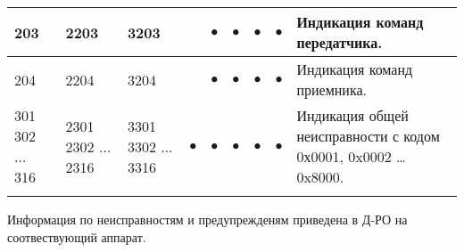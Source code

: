 \begin{tabularx}{\linewidth}{| *{3}{M{1cm} |} *{5}{M{0.3cm} |} X|}
	203			& %
	2203		& %
	3203		& %
			 	& %
	$\bullet$ 	& %
	$\bullet$ 	& %
	$\bullet$ 	& %
	$\bullet$ 	& %
	Индикация команд передатчика.	 
	\tabularnewline \hline
	
	204			& %
	2204		& %
	3204		& %
			 	& %
	$\bullet$ 	& %
	$\bullet$ 	& %
	$\bullet$ 	& %
	$\bullet$ 	& %
	Индикация команд приемника.	
	\tabularnewline \hline
	
	301  302 ...  316	& %
	2301 2302 ... 2316	& %
	3301 3302 ... 3316	& %
	$\bullet$ 	& %
	$\bullet$ 	& %
	$\bullet$ 	& %
	$\bullet$ 	& %
	$\bullet$ 	& %
	Индикация общей неисправности с кодом 0х0001, 0x0002 \ldots 0x8000.	 
	\tabularnewline \hline 
	 
	\lasthline
\end{tabularx}

Информация по неисправностям и предупрежденям приведена в Д-РО на соотвествующий аппарат. 




